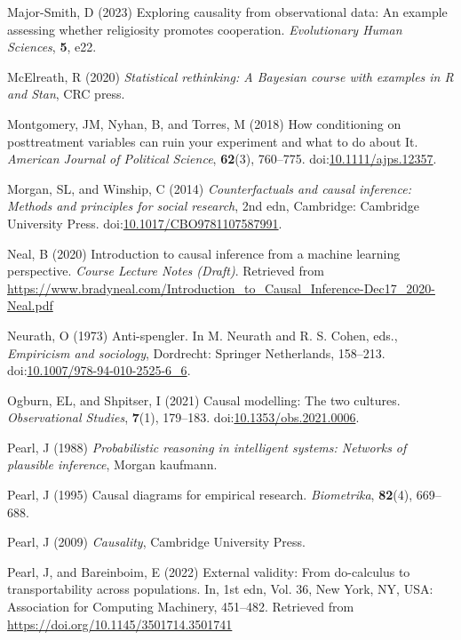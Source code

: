 \documentclass[
  single column]{article}
\newlength{\cslhangindent}
\newenvironment{CSLReferences}[2] %
 {\begin{list}{}{%
  \setlength{\itemindent}{0pt}
  \setlength{\leftmargin}{0pt}
  \setlength{\parsep}{0pt}
  \ifodd #1
   \setlength{\leftmargin}{\cslhangindent}
   \setlength{\itemindent}{-1\cslhangindent}
  \fi
  \setlength{\itemsep}{#2\baselineskip}}}
 {\end{list}}
\begin{document}
\begin{CSLReferences}{1}{0}
Major-Smith, D (2023) Exploring causality from observational data: An
example assessing whether religiosity promotes cooperation.
\emph{Evolutionary Human Sciences}, \textbf{5}, e22.

McElreath, R (2020) \emph{Statistical rethinking: A {B}ayesian course
with examples in {R} and {S}tan}, CRC press.

Montgomery, JM, Nyhan, B, and Torres, M (2018) How conditioning on
posttreatment variables can ruin your experiment and what to do about
It. \emph{American Journal of Political Science}, \textbf{62}(3),
760--775.
doi:\href{https://doi.org/10.1111/ajps.12357}{10.1111/ajps.12357}.

Morgan, SL, and Winship, C (2014) \emph{Counterfactuals and causal
inference: Methods and principles for social research}, 2nd edn,
Cambridge: Cambridge University Press.
doi:\href{https://doi.org/10.1017/CBO9781107587991}{10.1017/CBO9781107587991}.

Neal, B (2020) Introduction to causal inference from a machine learning
perspective. \emph{Course Lecture Notes (Draft)}. Retrieved from
\url{https://www.bradyneal.com/Introduction_to_Causal_Inference-Dec17_2020-Neal.pdf}

Neurath, O (1973) Anti-spengler. In M. Neurath and R. S. Cohen, eds.,
\emph{Empiricism and sociology}, Dordrecht: Springer Netherlands,
158--213.
doi:\href{https://doi.org/10.1007/978-94-010-2525-6_6}{10.1007/978-94-010-2525-6\_6}.

Ogburn, EL, and Shpitser, I (2021) Causal modelling: The two cultures.
\emph{Observational Studies}, \textbf{7}(1), 179--183.
doi:\href{https://doi.org/10.1353/obs.2021.0006}{10.1353/obs.2021.0006}.

Pearl, J (1988) \emph{Probabilistic reasoning in intelligent systems:
Networks of plausible inference}, Morgan kaufmann.

Pearl, J (1995) Causal diagrams for empirical research.
\emph{Biometrika}, \textbf{82}(4), 669--688.

Pearl, J (2009) \emph{Causality}, Cambridge University Press.

Pearl, J, and Bareinboim, E (2022) External validity: From do-calculus
to transportability across populations. In, 1st edn, Vol. 36, New York,
NY, USA: Association for Computing Machinery, 451--482. Retrieved from
\url{https://doi.org/10.1145/3501714.3501741}


\end{CSLReferences}
\end{document}
